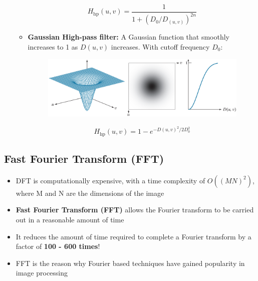 \begin{itemize}
\begin{itemize}
        \begin{equation*}
          H_\text{hp}(u, v) = \frac{1}{1 + (D_0/D_(u, v))^{2n}}
        \end{equation*}

      \item \textbf{Gaussian High-pass filter:} A Gaussian function
        that smoothly increases to 1 as $D(u, v)$ increases. With cutoff
        frequency $D_0$:

        \begin{minipage}{\linewidth}
          \begin{figure}[H]
            \centering
            \includegraphics[width=\linewidth]{images/gaussian_high_pass.png}
          \end{figure}
        \end{minipage}

        \begin{equation*}
          H_\text{hp}(u, v) = 1 - e^{-D(u, v)^2/2D_0^2}
        \end{equation*}

    \end{itemize}
\end{itemize}

\subsection*{Fast Fourier Transform (FFT)}

\begin{itemize}
  \item DFT is computationally expensive, with a time complexity of
    $O((MN)^2)$, where M and N are the dimensions of the image
  \item \textbf{Fast Fourier Transform (FFT)} allows the Fourier
    transform to be carried out in a reasonable amount of time
  \item It reduces the amount of time required to complete a Fourier
    transform by a factor of \textbf{100 - 600 times}!
  \item FFT is the reason why Fourier based techniques have gained
    popularity in image processing
\end{itemize}

